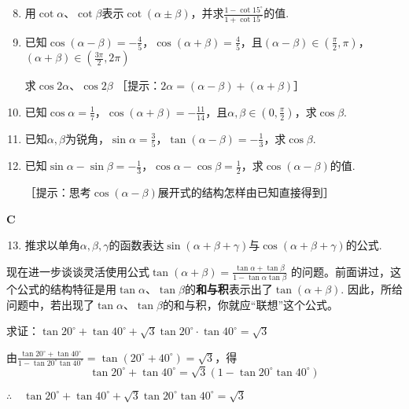 \begin{enumerate}\setcounter{enumi}{7}
    \item 用$\cot\alpha$、$\cot\beta$表示$\cot(\alpha\pm\beta)$，并求$\frac{1-\cot15^{\circ}}{1+\cot15^{\circ}}$的值.
\item 已知$\cos(\alpha-\beta)=-\frac{4}{5}$，$\cos(\alpha+\beta)=\frac{4}{5}$，且$(\alpha-\beta)\in\left(\frac{\pi}{2},\pi\right)$，$(\alpha+\beta)\in\left(\frac{3\pi}{2},2\pi\right)$

求$\cos2\alpha$、$\cos2\beta$ 
［提示：$2\alpha=(\alpha-\beta)+(\alpha+\beta)$］

\item 已知$\cos\alpha=\frac{1}{7}$，$\cos(\alpha+\beta)=-\frac{11}{14}$，且$\alpha,\beta\in\left(0,\frac{\pi}{2}\right)$，求$\cos\beta$.

\item 已知$\alpha,\beta$为锐角，$\sin\alpha=\frac{3}{5}$，$\tan(\alpha-\beta)=-\frac{1}{3}$，求$\cos\beta$.

\item 已知$\sin\alpha-\sin\beta=-\frac{1}{3}$，$\cos\alpha-\cos\beta=\frac{1}{2}$，求$\cos(\alpha-\beta)$的值.

［提示：思考$\cos(\alpha-\beta)$展开式的结构怎样由已知直接得到］
\end{enumerate}

\begin{center}
    \bfseries C
\end{center}
\begin{enumerate}\setcounter{enumi}{12}
    \item 推求以单角$\alpha,\beta,\gamma$的函数表达$\sin(\alpha+\beta+\gamma)$与$\cos(\alpha+\beta+\gamma)$的公式.
\end{enumerate}

现在进一步谈谈灵活使用公式$\tan(\alpha+\beta)=\frac{\tan\alpha+\tan\beta}{1-\tan\alpha\tan\beta}$
的问题。前面讲过，这个公式的结构特征是用$\tan\alpha$、$\tan\beta$的\textbf{和与积}表示出了$\tan(\alpha+\beta)$. 因此，所给问题中，若出现了$\tan\alpha$、$\tan\beta$的和与积，你就应“联想”这个公式。

\begin{example}
   求证：$\tan20^{\circ}+\tan40^{\circ}+\sqrt{3}\tan 20^{\circ}\cdot \tan40^{\circ}=\sqrt{3}$ 
\end{example}

\begin{solution}
由$\frac{\tan20^{\circ}+\tan40^{\circ}}{1-\tan20^{\circ}\tan40^{\circ}}=\tan(20^{\circ}+40^{\circ})=\sqrt{3}$，得
\[\tan20^{\circ}+\tan40^{\circ}=\sqrt{3}\left(1-\tan20^{\circ}\tan40^{\circ}\right)\]

$\therefore\quad \tan20^{\circ}+\tan40^{\circ}+\sqrt{3}\tan 20^{\circ} \tan40^{\circ}=\sqrt{3}$
\end{solution}

